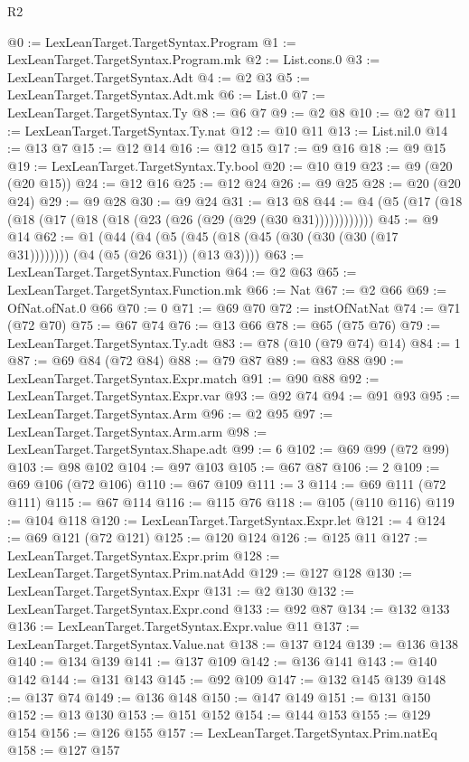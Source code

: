 \begin{lexlean}{R2}
\begin{coremodule}
@0 := LexLeanTarget.TargetSyntax.Program
@1 := LexLeanTarget.TargetSyntax.Program.mk
@2 := List.cons.{0}
@3 := LexLeanTarget.TargetSyntax.Adt
@4 := @2 @3
@5 := LexLeanTarget.TargetSyntax.Adt.mk
@6 := List.{0}
@7 := LexLeanTarget.TargetSyntax.Ty
@8 := @6 @7
@9 := @2 @8
@10 := @2 @7
@11 := LexLeanTarget.TargetSyntax.Ty.nat
@12 := @10 @11
@13 := List.nil.{0}
@14 := @13 @7
@15 := @12 @14
@16 := @12 @15
@17 := @9 @16
@18 := @9 @15
@19 := LexLeanTarget.TargetSyntax.Ty.bool
@20 := @10 @19
@23 := @9 (@20 (@20 @15))
@24 := @12 @16
@25 := @12 @24
@26 := @9 @25
@28 := @20 (@20 @24)
@29 := @9 @28
@30 := @9 @24
@31 := @13 @8
@44 := @4 (@5 (@17 (@18 (@18 (@17 (@18 (@18 (@23 (@26 (@29 (@29 (@30 @31))))))))))))
@45 := @9 @14
@62 := @1 (@44 (@4 (@5 (@45 (@18 (@45 (@30 (@30 (@30 (@17 @31)))))))) (@4 (@5 (@26 @31)) (@13 @3))))
@63 := LexLeanTarget.TargetSyntax.Function
@64 := @2 @63
@65 := LexLeanTarget.TargetSyntax.Function.mk
@66 := Nat
@67 := @2 @66
@69 := OfNat.ofNat.{0} @66
@70 := 0
@71 := @69 @70
@72 := instOfNatNat
@74 := @71 (@72 @70)
@75 := @67 @74
@76 := @13 @66
@78 := @65 (@75 @76)
@79 := LexLeanTarget.TargetSyntax.Ty.adt
@83 := @78 (@10 (@79 @74) @14)
@84 := 1
@87 := @69 @84 (@72 @84)
@88 := @79 @87
@89 := @83 @88
@90 := LexLeanTarget.TargetSyntax.Expr.match
@91 := @90 @88
@92 := LexLeanTarget.TargetSyntax.Expr.var
@93 := @92 @74
@94 := @91 @93
@95 := LexLeanTarget.TargetSyntax.Arm
@96 := @2 @95
@97 := LexLeanTarget.TargetSyntax.Arm.arm
@98 := LexLeanTarget.TargetSyntax.Shape.adt
@99 := 6
@102 := @69 @99 (@72 @99)
@103 := @98 @102
@104 := @97 @103
@105 := @67 @87
@106 := 2
@109 := @69 @106 (@72 @106)
@110 := @67 @109
@111 := 3
@114 := @69 @111 (@72 @111)
@115 := @67 @114
@116 := @115 @76
@118 := @105 (@110 @116)
@119 := @104 @118
@120 := LexLeanTarget.TargetSyntax.Expr.let
@121 := 4
@124 := @69 @121 (@72 @121)
@125 := @120 @124
@126 := @125 @11
@127 := LexLeanTarget.TargetSyntax.Expr.prim
@128 := LexLeanTarget.TargetSyntax.Prim.natAdd
@129 := @127 @128
@130 := LexLeanTarget.TargetSyntax.Expr
@131 := @2 @130
@132 := LexLeanTarget.TargetSyntax.Expr.cond
@133 := @92 @87
@134 := @132 @133
@136 := LexLeanTarget.TargetSyntax.Expr.value @11
@137 := LexLeanTarget.TargetSyntax.Value.nat
@138 := @137 @124
@139 := @136 @138
@140 := @134 @139
@141 := @137 @109
@142 := @136 @141
@143 := @140 @142
@144 := @131 @143
@145 := @92 @109
@147 := @132 @145 @139
@148 := @137 @74
@149 := @136 @148
@150 := @147 @149
@151 := @131 @150
@152 := @13 @130
@153 := @151 @152
@154 := @144 @153
@155 := @129 @154
@156 := @126 @155
@157 := LexLeanTarget.TargetSyntax.Prim.natEq
@158 := @127 @157

\end{coremodule}
\end{lexlean}
